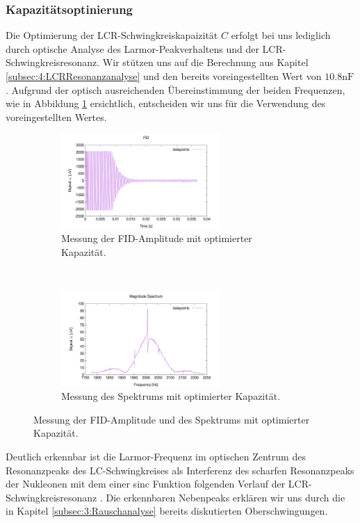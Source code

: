 \documentclass{article}
\begin{document}
        \subsubsection*{Kapazitätsoptinierung}\label{subsubsec:5:Kapazitaetsoptimierung}
            Die Optimierung der LCR-Schwingkreiskapaizität $C$ erfolgt bei uns lediglich durch optische Analyse des Larmor-Peakverhaltens und der LCR-Schwingkreisresonanz. Wir stützen uns auf die Berechnung aus Kapitel \ref{subsec:4:LCRResonanzanalyse} und den bereits voreingestellten Wert von $10.8\si{\nano\farad}$. Aufgrund der optisch ausreichenden Übereinstimmung der beiden Frequenzen, wie in Abbildung \ref{fig:5:OptiCSpectrum} ersichtlich, entscheiden wir uns für die Verwendung des voreingestellten Wertes.
            \begin{figure}[H]
                \centering
                \begin{subfigure}[t]{0.45\textwidth}
                    \centering
                    \includegraphics[width=6cm]{../Bilddateien/C_Opti_FID.png}
                    \caption{Messung der FID-Amplitude mit optimierter Kapazität.}
                \end{subfigure}
                \
                \begin{subfigure}[t]{0.45\textwidth}
                    \centering
                    \includegraphics[width=6cm]{../Bilddateien/C_Opti_Spectrum.png}
                    \caption{Messung des Spektrums mit optimierter Kapazität.}
                \end{subfigure}
                \caption{Messung der FID-Amplitude und des Spektrums mit optimierter Kapazität.}
                \label{fig:5:OptiCSpectrum}
            \end{figure}
            Deutlich erkennbar ist die Larmor-Frequenz im optischen Zentrum des Resonanzpeaks des LC-Schwingkreises als Interferenz des scharfen Resonanzpeaks der Nukleonen mit dem einer sinc Funktion folgenden Verlauf der LCR-Schwingkreisresonanz \cite[ch 1.4.5]{doc:EFNMRStudentManual}. Die erkennbaren Nebenpeaks erklären wir uns durch die in Kapitel \ref{subsec:3:Rauschanalyse} bereits diskutierten Oberschwingungen. 
            
\end{document}
